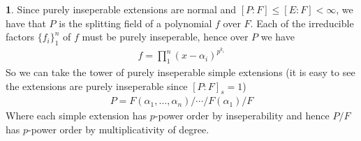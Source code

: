 \documentclass[11pt]{article}
\theoremstyle{definition}
\newtheorem{pb}{}
\newcommand{\set}[1]{\{#1\}}
\begin{document}
\begin{pb}
        Since purely inseperable extensions are normal and \([P:F] \leq [E:F] < \infty\), we have that \(P\) is the splitting field of a polynomial \(f\) over \(F\).
        Each of the irreducible factors \(\set{f_i}_1^n\) of \(f\) must be purely inseperable, hence over \(P\) we have
        \begin{align*}
            f = \prod_1^n (x-\alpha_i)^{p^{k_i}}
        \end{align*}
        So we can take the tower of purely inseperable simple extensions (it is easy to see the extensions are purely inseperable since \([P:F]_s = 1\))
        \begin{align*}
            P = F(\alpha_1,\hdots,\alpha_n)/\cdots/F(\alpha_1)/F
        \end{align*}
        Where each simple extension has \(p\)-power order by inseperability and hence \(P/F\) has \(p\)-power order by multiplicativity of degree.
    \end{pb}
\end{document}
